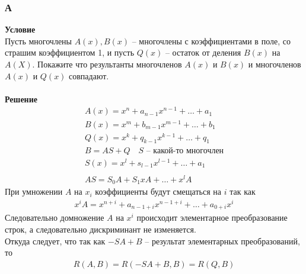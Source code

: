 	\subsubsection*{\textbf{А}}
	\textbf{Условие}\\
	Пусть многочлены $A(x), B(x)$ -- многочлены с коэффициентами в поле, со страшим коэффициентом 1, и пусть $Q(x)$ -- остаток от деления $B(x)$ на $A(X)$. Покажите что результанты многочленов $A(x)$ и $B(x)$ и многочленов $A(x)$ и $Q(x)$ совпадают.\\
	\\
	\textbf{Решение}\\
	\begin{gather*}
		A(x) = x^{n} + a_{n-1}x^{n-1} + \ldots + a_1\\
		B(x) = x^{m} + b_{m-1}x^{m-1} + \ldots + b_1\\
		Q(x) = x^{k} + q_{k-1}x^{k-1} + \ldots + q_1\\
		B = AS + Q\quad S \text{ -- какой-то многочлен}\\
		S(x) = x^{l} + s_{l-1}x^{l-1} + \ldots + a_1\\
		\\
		AS = S_0A + S_1xA + \ldots + x^{l} A
	\end{gather*}
	При умножении $A$ на $x_i$ коэффициенты будут смещаться на $i$ так как
	\begin{gather*}
		x^{i} A = x^{n+i} + a_{n-1+i} x^{n-1+i} + \ldots + a_{0 + i} x^{i}
	\end{gather*}
	Следовательно домножение $A$ на $x^{i}$ происходит элементарное преобразование строк, а следовательно дискриминант не изменяется.\\
	Откуда следует, что так как $-SA + B$ -- результат элементарных преобразований, то
	\begin{gather*}
		R(A,B) = R(-SA+B, B) = R(Q,B)
	\end{gather*}
	
	\newpage
